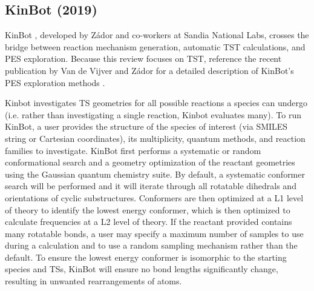 \documentclass[preprint, 11pt]{elsarticle} %
\begin{document}

\subsection{KinBot (2019)}


KinBot \cite{kinbot:2018, kinbot:2019}, developed by Z\'{a}dor and co-workers at Sandia National Labs, crosses the bridge between reaction mechanism generation, automatic TST calculations, and PES exploration.
Because this review focuses on TST, reference the recent publication by Van de Vijver and Z\'{a}dor for a detailed description of KinBot's PES exploration methods \cite{kinbot:2019}.

Kinbot investigates TS geometries for all possible reactions a species can undergo (i.e. rather than investigating a single reaction, Kinbot evaluates many).
To run KinBot, a user provides the structure of the species of interest (via SMILES string or Cartesian coordinates), its multiplicity, quantum methods, and reaction families to investigate. 
KinBot first performs a systematic or random conformational search and a geometry optimization of the reactant geometries using the Gaussian quantum chemistry suite.
By default, a systematic conformer search will be performed and it will iterate through all rotatable dihedrals and orientations of cyclic substructures. 
Conformers are then optimized at a L1 level of theory to identify the lowest energy conformer, which is then optimized to calculate frequencies at a L2 level of theory.
If the reactant provided contains many rotatable bonds, a user may specify a maximum number of samples to use during a calculation and to use a random sampling mechanism rather than the default.
To ensure the lowest energy conformer is isomorphic to the starting species and TSs, KinBot will ensure no bond lengths significantly change, resulting in unwanted rearrangements of atoms.
\end{document}
